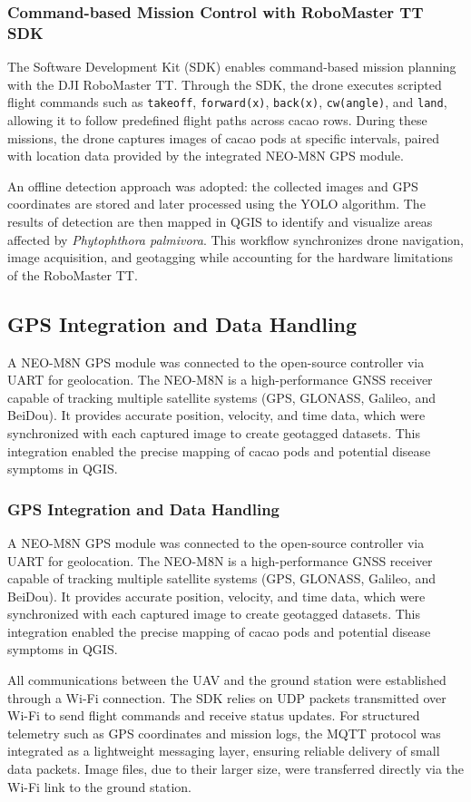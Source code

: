 \subsubsection*{Command-based Mission Control with RoboMaster TT SDK}
The Software Development Kit (SDK) enables command-based mission planning with the
DJI RoboMaster TT. Through the SDK, the drone executes scripted flight commands such as
\texttt{takeoff}, \texttt{forward(x)}, \texttt{back(x)}, \texttt{cw(angle)}, and \texttt{land},
allowing it to follow predefined flight paths across cacao rows. During these missions, the drone
captures images of cacao pods at specific intervals, paired with location data provided by the
integrated NEO-M8N GPS module.

An offline detection approach was adopted: the collected images and GPS coordinates are stored and later processed using the YOLO algorithm. The results of detection are then mapped in QGIS to identify and visualize areas affected by \textit{Phytophthora palmivora}. This workflow synchronizes drone navigation, image acquisition, and geotagging while accounting for the hardware limitations of the RoboMaster TT.

\subsection*{GPS Integration and Data Handling}
A NEO-M8N GPS module was connected to the open-source controller via UART for geolocation. The NEO-M8N is a high-performance GNSS receiver capable of tracking multiple satellite systems (GPS, GLONASS, Galileo, and BeiDou). It provides accurate position, velocity, and time data, which were synchronized with each captured image to create geotagged datasets. This integration enabled the precise mapping of cacao pods and potential disease symptoms in QGIS.
\subsubsection*{GPS Integration and Data Handling}
A NEO-M8N GPS module was connected to the open-source controller via UART for geolocation.
The NEO-M8N is a high-performance GNSS receiver capable of tracking multiple satellite systems
(GPS, GLONASS, Galileo, and BeiDou). It provides accurate position, velocity, and time data,
which were synchronized with each captured image to create geotagged datasets. This integration
enabled the precise mapping of cacao pods and potential disease symptoms in QGIS.

All communications between the UAV and the ground station were established through a Wi-Fi connection. The SDK relies on UDP packets transmitted over Wi-Fi to send flight commands and receive status updates. For structured telemetry such as GPS coordinates
and mission logs, the MQTT protocol was integrated as a lightweight messaging layer, ensuring reliable delivery of small data packets. Image files, due to their larger size, were transferred directly via the Wi-Fi link to the ground station.

